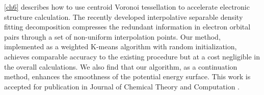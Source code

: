 \cref{ch6} describes how to use centroid Voronoi tessellation to accelerate
electronic structure calculation. The recently developed interpolative separable
density fitting decomposition compresses the redundant information in electron
orbital pairs through a set of non\hyp{}uniform interpolation points. Our
method, implemented as a weighted K-means algorithm with random initialization,
achieves comparable accuracy to the existing procedure but at a cost negligible
in the overall calculations. We also find that our algorithm, as a continuation
method, enhances the smoothness of the potential energy surface. This work is
accepted for publication in Journal of Chemical Theory and Computation
\cite{dong2018interpolative}.